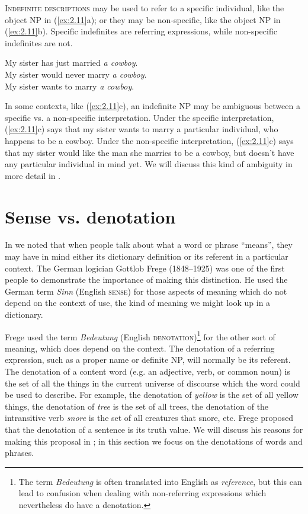 \textsc{Indefinite descriptions} may be used to refer to a specific individual, like the object NP in (\ref{ex:2.11}a); or they may be non-specific, like the object NP in (\ref{ex:2.11}b). Specific indefinites are referring expressions, while non-specific indefinites are not.


\ea \label{ex:2.11}
\ea My sister has just married \textit{a cowboy}.\\
\ex My sister would never marry \textit{a cowboy}.\\
\ex My sister wants to marry \textit{a cowboy}.
                       \z
\z


In some contexts, like (\ref{ex:2.11}c), an indefinite NP may be ambiguous between a specific vs. a non-specific interpretation. Under the specific interpretation, (\ref{ex:2.11}c) says that my sister wants to marry a particular individual, who happens to be a cowboy. Under the non-specific interpretation, (\ref{ex:2.11}c) says that my sister would like the man she marries to be a cowboy, but doesn’t have any particular individual in mind yet. We will discuss this kind of ambiguity in more detail in .


\section{Sense vs. denotation}\label{sec:2.4}
\largerpage
In  we noted that when people talk about what a word or phrase “means”, they may have in mind either its dictionary definition or its referent in a particular context. The German logician Gottlob Frege (1848–1925) was one of the first people to demonstrate the importance of making this distinction. He used the German term \textit{Sinn} (English \textsc{sense}) for those aspects of meaning which do not depend on the context of use, the kind of meaning we might look up in a dictionary.



Frege used the term \textit{Bedeutung} (English \textsc{denotation})\footnote{The term \textit{Bedeutung} is often translated into English as \textit{reference}, but this can lead to confusion when dealing with non-referring expressions which nevertheless do have a denotation.} for the other sort of meaning, which does depend on the context. The denotation of a referring expression, such as a proper name or definite NP, will normally be its referent. The denotation of a content word (e.g. an adjective, verb, or common noun) is the set of all the things in the current universe of discourse which the word could be used to describe. For example, the denotation of \textit{yellow} is the set of all yellow things, the denotation of \textit{tree} is the set of all trees, the denotation of the intransitive verb \textit{snore} is the set of all creatures that snore, etc. Frege proposed that the denotation of a sentence is its truth value. We will discuss his reasons for making this proposal in ; in this section we focus on the denotations of words and phrases.



